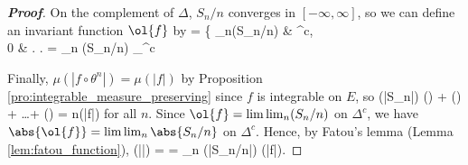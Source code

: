 \begin{proof}[\bf Proof]
On the complement of $\Delta$, $S_n/n$ converges in $[-\infty,\infty]$, so we can define an invariant function $\ol{f}$ by
\be
{} = \left\{
\lim_n(S_n/n) \quad\quad &  \Delta^c,\\
0 & \Delta.
\ea\right.\qquad {}  = \lim_n (S_n/n) \ind_{\Delta^c}
\ee

Finally, $\mu(|f \circ \theta^n|) = \mu(|f|)$ by Proposition \ref{pro:integrable_measure_preserving} since $f$ is integrable on $E$, so
\be
\mu(|S_n|) \leq \mu() + \mu () + \dots + \mu() = n\mu(|f|)
\ee
for all $n$. Since $\ol{f} = \lim \lim_n(S_n/n)$ on $\Delta^c$, we have $\abs{\ol{f}} = \lim \lim_n\abs{S_n/n}$ on $\Delta^c$. Hence, by Fatou's lemma (Lemma \ref{lem:fatou_function}),
\be
\mu(||) = \mu {} = \mu{} \leq \liminf\limits_n \mu(|S_n/n|) \leq \mu(|f|).
\ee
\end{proof}



